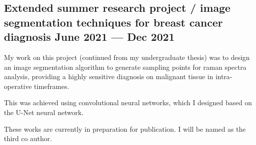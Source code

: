 \subsection{{Extended summer research project / image segmentation techniques for breast cancer diagnosis \hfill June 2021 --- Dec 2021}}
\begin{zitemize}
\item My work on this project (continued from my undergraduate thesis) was to design an image segmentation algorithm to generate sampling points for raman spectra analysis, providing a highly sensitive diagnosis on malignant tissue in intra-operative timeframes.
\item This was achieved using convolutional neural networks, which I designed based on the U-Net neural network.
\item These works are currently in preparation for publication. I will be named as the third co author.
\end{zitemize}

